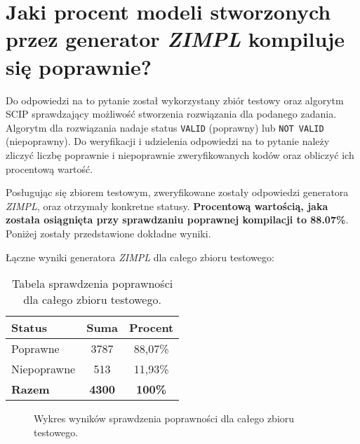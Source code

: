 \section{Jaki procent modeli stworzonych przez generator  \textit{ZIMPL} kompiluje się poprawnie?}

Do odpowiedzi na to pytanie został wykorzystany zbiór testowy oraz algorytm SCIP sprawdzający możliwość stworzenia rozwiązania dla podanego zadania. Algorytm dla rozwiązania nadaje status \texttt{VALID} (poprawny) lub \texttt{NOT VALID} (niepoprawny). Do weryfikacji i udzielenia odpowiedzi na to pytanie należy zliczyć liczbę poprawnie i niepoprawnie zweryfikowanych kodów oraz obliczyć ich procentową wartość.

Posługując się zbiorem testowym, zweryfikowane zostały odpowiedzi generatora \textit{ZIMPL}, oraz otrzymały konkretne statusy. \textbf{Procentową wartością, jaka została osiągnięta przy sprawdzaniu poprawnej kompilacji to 88.07\%}. Poniżej zostały przedstawione dokładne wyniki.

Łączne wyniki generatora \textit{ZIMPL} dla całego zbioru testowego:

\begin{table}[ht]
\caption{Tabela sprawdzenia poprawności dla całego zbioru testowego.}\label{tab:tabela1}
\centering%
\begin{tabular}{|l|c|c|}
\hline
\textbf{Status} & \textbf{Suma} & \textbf{Procent} \\
\hline
Poprawne & 3787 & 88,07\% \\
\hline
Niepoprawne & 513 & 11,93\% \\
\hline
\textbf{Razem} & \textbf{4300} & \textbf{100\%} \\
\hline
\end{tabular}
\end{table}

\begin{figure}[H]
\centering
{}
\caption{Wykres wyników sprawdzenia poprawności dla całego zbioru testowego.}\label{rys:plama2a}
\end{figure}

